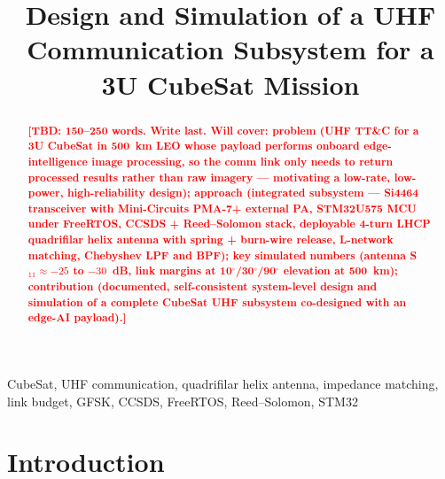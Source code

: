 \documentclass[conference]{IEEEtran}
\newcommand{\tbd}[1]{\textcolor{red}{\textbf{[TBD: #1]}}}
\begin{document}
\title{Design and Simulation of a UHF Communication Subsystem for a 3U CubeSat Mission}


\author{
}

\maketitle

\begin{abstract}
\tbd{150--250 words. Write last. Will cover: problem (UHF TT\&C for a 3U CubeSat in 500~km LEO whose payload performs onboard edge-intelligence image processing, so the comm link only needs to return processed results rather than raw imagery --- motivating a low-rate, low-power, high-reliability design); approach (integrated subsystem --- Si4464 transceiver with Mini-Circuits PMA-7+ external PA, STM32U575 MCU under FreeRTOS, CCSDS + Reed--Solomon stack, deployable 4-turn LHCP quadrifilar helix antenna with spring + burn-wire release, L-network matching, Chebyshev LPF and BPF); key simulated numbers (antenna S$_{11} \approx -25$ to $-30$~dB, link margins at 10$^\circ$/30$^\circ$/90$^\circ$ elevation at 500~km); contribution (documented, self-consistent system-level design and simulation of a complete CubeSat UHF subsystem co-designed with an edge-AI payload).}
\end{abstract}

\begin{IEEEkeywords}
CubeSat, UHF communication, quadrifilar helix antenna, impedance matching, link budget, GFSK, CCSDS, FreeRTOS, Reed--Solomon, STM32
\end{IEEEkeywords}

\section{Introduction}
\end{document}
